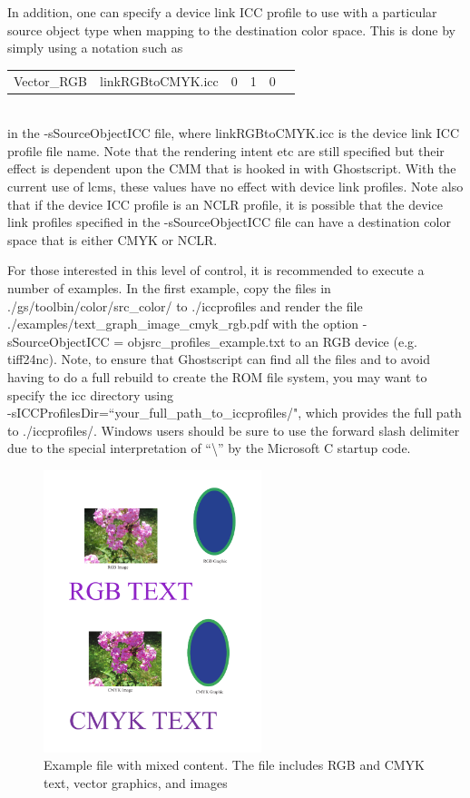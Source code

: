 \documentclass[12pt,notitlepage]{article}
\begin{document}
In addition, one can specify a device link ICC profile to use with a particular source object type when mapping to the destination color space.  This is done by simply using a notation such as\\

\begin{tabular}{llllll}
Vector\_RGB &	linkRGBtoCMYK.icc	& 0 & 1 & 0 & \\
\end{tabular}\\

\noindent in the -sSourceObjectICC file, where linkRGBtoCMYK.icc is the device link ICC profile file name.  Note that the rendering intent etc are still specified but their effect is dependent upon the CMM that is hooked in with Ghostscript.  With the current use of lcms, these values have no effect with device link profiles.   Note also that if the device ICC profile is an NCLR profile, it is possible that the device link profiles specified in the -sSourceObjectICC file can have a destination color space that is either CMYK or NCLR.

For those interested in this level of control, it is recommended to execute a number of examples.
In the first example, copy the files in ./gs/toolbin/color/src\_color/ to ./iccprofiles and render the file ./examples/text\_graph\_image\_cmyk\_rgb.pdf with the option -sSourceObjectICC = objsrc\_profiles\_example.txt to an RGB device (e.g. tiff24nc).  Note, to ensure that Ghostscript can find all the files and to avoid having to do a full rebuild to create the ROM file system, you may want to specify the icc directory using\\
 -sICCProfilesDir=``your\_full\_path\_to\_iccprofiles/", which provides the full path to ./iccprofiles/.   Windows users should be sure to use the forward slash delimiter due to the special interpretation of ``\textbackslash'' by the Microsoft C startup code.

\begin{figure}
    \begin{center}
\includegraphics*[width=2.5in]{figures/text_graph_image_cmyk_rgb.pdf}
    \end{center}
   \caption{Example file with mixed content. The file includes RGB and CMYK text, vector graphics, and images}
    \label{fig:normal}
\end{figure}
\end{document}
